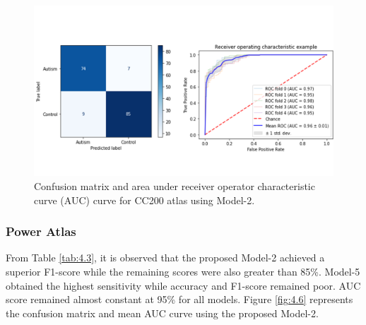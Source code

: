 \begin{figure}[h!]
\centering
\includegraphics[width=\linewidth]{figures/Figure 4.5.png}
\caption{Confusion matrix and area under receiver operator characteristic curve (AUC) curve for CC200 atlas using Model-2.}
\label{fig:4.5}
\end{figure}

\subsubsection{Power Atlas}
From Table \ref{tab:4.3}, it is observed that the proposed Model-2 achieved a superior F1-score while the remaining scores were also greater than 85\%. Model-5 obtained the highest sensitivity while accuracy and F1-score remained poor. AUC score remained almost constant at 95\% for all models. Figure \ref{fig:4.6} represents the confusion matrix and mean AUC curve using the proposed Model-2.

